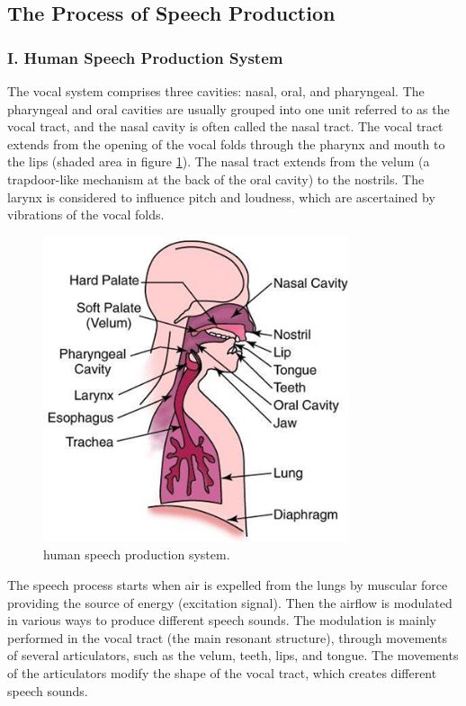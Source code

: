 \documentclass[12pt, a4paper, twoside]{report}
\begin{document}
\subsection{The Process of Speech Production}
\subsubsection{I. Human Speech Production System}
 The vocal system comprises three cavities: nasal, oral, and pharyngeal. The pharyngeal and oral cavities are usually grouped into one unit referred to as the vocal tract, and the nasal cavity is often called the nasal tract. The vocal tract extends from the opening of the vocal folds through the pharynx and mouth to the lips (shaded area in figure \ref{fig:human-speech-prod}). The nasal tract extends from the velum (a trapdoor-like mechanism at the back of the oral cavity) to the nostrils. The larynx is considered to influence pitch and loudness, which are ascertained by vibrations of the vocal folds.

\begin{figure}[ht]
	\centering
	\includegraphics[width=0.8\textwidth]
	{images/chapter2/human-speech-prod}
	\caption{human speech production system.}
	\label{fig:human-speech-prod}
\end{figure}

The speech process starts when air is expelled from the lungs by muscular force providing the source of energy (excitation signal). Then the airflow is modulated in various ways to produce different speech sounds. The modulation is mainly performed in the vocal tract (the main resonant structure), through movements of several articulators, such as the velum, teeth, lips, and tongue. The movements of the articulators modify the shape of the vocal tract, which creates different speech sounds.
\end{document}
